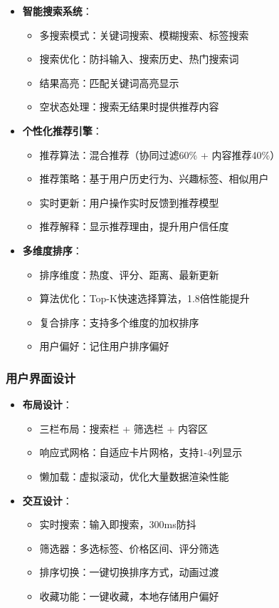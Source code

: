 \documentclass[12pt,a4paper]{article}
\begin{document}
\begin{itemize}
    \item \textbf{智能搜索系统}：
    \begin{itemize}
        \item 多搜索模式：关键词搜索、模糊搜索、标签搜索
        \item 搜索优化：防抖输入、搜索历史、热门搜索词
        \item 结果高亮：匹配关键词高亮显示
        \item 空状态处理：搜索无结果时提供推荐内容
    \end{itemize}
    
    \item \textbf{个性化推荐引擎}：
    \begin{itemize}
        \item 推荐算法：混合推荐（协同过滤60\% + 内容推荐40\%）
        \item 推荐策略：基于用户历史行为、兴趣标签、相似用户
        \item 实时更新：用户操作实时反馈到推荐模型
        \item 推荐解释：显示推荐理由，提升用户信任度
    \end{itemize}
    
    \item \textbf{多维度排序}：
    \begin{itemize}
        \item 排序维度：热度、评分、距离、最新更新
        \item 算法优化：Top-K快速选择算法，1.8倍性能提升
        \item 复合排序：支持多个维度的加权排序
        \item 用户偏好：记住用户排序偏好
    \end{itemize}
\end{itemize}

\subsubsection{用户界面设计}

\begin{itemize}
    \item \textbf{布局设计}：
    \begin{itemize}
        \item 三栏布局：搜索栏 + 筛选栏 + 内容区
        \item 响应式网格：自适应卡片网格，支持1-4列显示
        \item 懒加载：虚拟滚动，优化大量数据渲染性能
    \end{itemize}
    
    \item \textbf{交互设计}：
    \begin{itemize}
        \item 实时搜索：输入即搜索，300ms防抖
        \item 筛选器：多选标签、价格区间、评分筛选
        \item 排序切换：一键切换排序方式，动画过渡
        \item 收藏功能：一键收藏，本地存储用户偏好
    \end{itemize}
\end{itemize}
\end{document}
